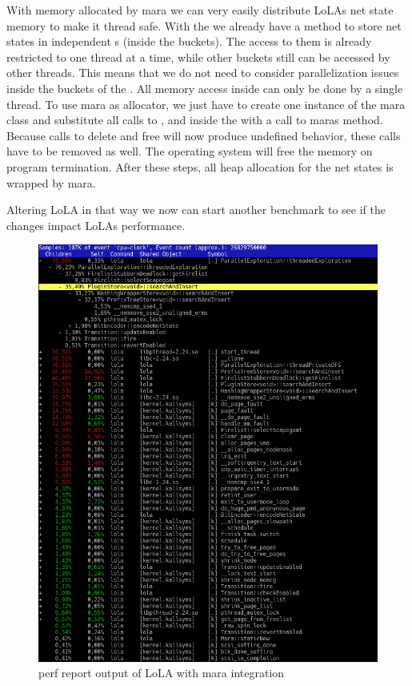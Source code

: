 With memory allocated by mara we can very easily distribute LoLAs net state memory to make it thread safe. With the  we already have a method to store net states in independent s (inside the buckets). The access to them is already restricted to one thread at a time, while other buckets still can be accessed by other threads. This means that we do not need to consider parallelization issues inside the buckets of the . All memory access inside can only be done by a single thread. To use mara as allocator, we just have to create one instance of the mara class and substitute all calls to ,  and  inside the  with a call to maras  method. Because calls to delete and free will now produce undefined behavior, these calls have to be removed as well. The operating system will free the memory on program termination. After these steps, all heap allocation for the net states is wrapped by mara. 

Altering LoLA in that way we now can start another benchmark to see if the changes impact LoLAs performance. 

\begin{figure}
    \centering
    \includegraphics[width=\textwidth]{pictures/perfReportMara.png}
    \caption{perf report output of LoLA with mara integration}
    \label{perf_record_mara}
\end{figure}

